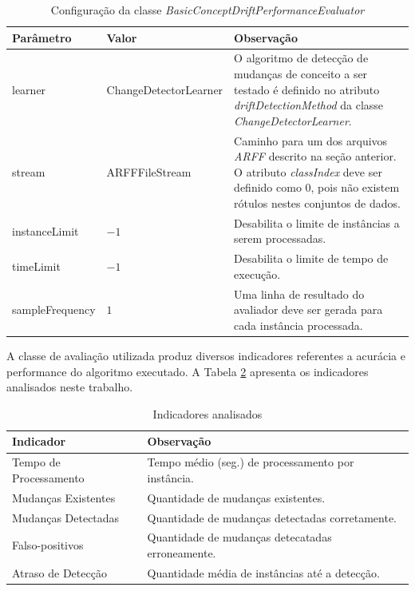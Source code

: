 \documentclass[msc, classic, a4paper]{ufbathesis}
\begin{document}
\begin{center}
    \begin{table}[h]
    \caption{Configuração da classe \textit{BasicConceptDriftPerformanceEvaluator}}
    \label{tbl:configuracao_tarefa}
    \resizebox{\textwidth}{!} {%
    \begin{tabular}{llm{7.5cm}}
    \toprule
    Parâmetro & Valor & Observação \\
    \midrule
    learner          & ChangeDetectorLearner  &  O algoritmo de detecção de mudanças de conceito a ser testado é definido no atributo \textit{driftDetectionMethod} da classe \textit{ChangeDetectorLearner}.                   \\
    stream           & ARFFFileStream         &  Caminho para um dos arquivos \textit{ARFF} descrito na seção anterior. O atributo \textit{classIndex} deve ser definido como $0$, pois não existem rótulos nestes conjuntos de dados.  \\
    instanceLimit    & $-1$                            &  Desabilita o limite de instâncias a serem processadas.  \\
    timeLimit        & $-1$                            &  Desabilita o limite de tempo de execução.  \\
    sampleFrequency  & \hspace{3mm}$1$                 &  Uma linha de resultado do avaliador deve ser gerada para cada instância processada.  \\
    \bottomrule
    \end{tabular}
    }
    \end{table}
\end{center}

A classe de avaliação utilizada produz diversos indicadores referentes a acurácia e performance do algoritmo executado.
A Tabela \ref{tbl:indicadores_analisado} apresenta os indicadores analisados neste trabalho.

\begin{center}
    \begin{table}[h]
    \caption{Indicadores analisados}
    \label{tbl:indicadores_analisado}
    \resizebox{\textwidth}{!} {%
    \begin{tabular}{lm{10cm}}
    \toprule
    Indicador & Observação \\
    \midrule
    Tempo de Processamento    &  Tempo médio (seg.) de processamento por instância. \\
    Mudanças Existentes       &  Quantidade de mudanças existentes. \\
    Mudanças Detectadas       &  Quantidade de mudanças detectadas corretamente. \\
    Falso-positivos           &  Quantidade de mudanças detecatadas erroneamente. \\
    Atraso de Detecção        &  Quantidade média de instâncias até a detecção. \\
    \bottomrule
    \end{tabular}
    }
    \end{table}
\end{center}
\end{document}
